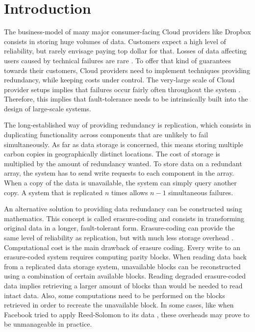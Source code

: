 \chapter{Introduction}

The business-model of many major consumer-facing Cloud providers like Dropbox consists in storing huge volumes of data.
Customers expect a high level of reliability, but rarely envisage paying top dollar for that.
Losses of data affecting users caused by technical failures are rare \autocite{racs}.
To offer that kind of guarantees towards their customers, Cloud providers need to implement techniques providing redundancy, while keeping costs under control.
The very-large scale of Cloud provider setups implies that failures occur fairly often throughout the system \autocite{failures-study}.
Therefore, this implies that fault-tolerance needs to be intrinsically built into the design of large-scale systems.

The long-established way of providing redundancy is replication, which consists in duplicating functionality across components that are unlikely to fail simultaneously.
As far as data storage is concerned, this means storing multiple carbon copies in geographically distinct locations.
The cost of storage is multiplied by the amount of redundancy wanted.
To store data on a redundant array, the system has to send write requests to each component in the array.
When a copy of the data is unavailable, the system can simply query another copy.
A system that is replicated $n$ times allows $n-1$ simultaneous failures.

An alternative solution to providing data redundancy can be constructed using mathematics.
This concept is called erasure-coding and consists in transforming original data in a longer, fault-tolerant form.
Erasure-coding can provide the same level of reliability as replication, but with much less storage overhead \autocite{Weatherspoon2002}.
Computational cost is the main drawback of erasure coding.
Every write to an erasure-coded system requires computing parity blocks.
When reading data back from a replicated data storage system, unavailable blocks can be reconstructed using a combination of certain available blocks.
Reading degraded erasure-coded data implies retrieving a larger amount of blocks than would be needed to read intact data.
Also, some computations need to be performed on the blocks retrieved in order to recreate the unavailable block.
In some cases, like when Facebook tried to apply Reed-Solomon to its data \autocite{XorbasVLDB}, these overheads may prove to be unmanageable in practice.

